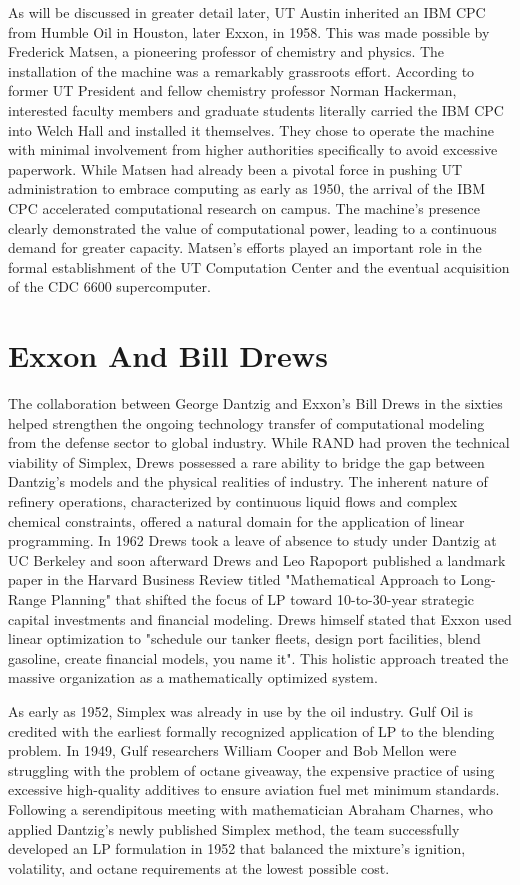 As will be discussed in greater detail later, UT Austin inherited an IBM CPC from Humble Oil in Houston, later Exxon, in 1958. This was made possible by Frederick Matsen, a pioneering professor of chemistry and physics. The installation of the machine was a remarkably grassroots effort. According to former UT President and fellow chemistry professor Norman Hackerman, interested faculty members and graduate students literally carried the IBM CPC into Welch Hall and installed it themselves. They chose to operate the machine with minimal involvement from higher authorities specifically to avoid excessive paperwork. While Matsen had already been a pivotal force in pushing UT administration to embrace computing as early as 1950, the arrival of the IBM CPC accelerated computational research on campus. The machine's presence clearly demonstrated the value of computational power, leading to a continuous demand for greater capacity. Matsen's efforts played an important role in the formal establishment of the UT Computation Center and the eventual acquisition of the CDC 6600 supercomputer.

\section{Exxon And Bill Drews}

The collaboration between George Dantzig and Exxon’s Bill Drews in the sixties helped strengthen the ongoing technology transfer of computational modeling from the defense sector to global industry. While RAND had proven the technical viability of Simplex, Drews possessed a rare ability to bridge the gap between Dantzig’s models and the physical realities of industry. The inherent nature of refinery operations, characterized by continuous liquid flows and complex chemical constraints, offered a natural domain for the application of linear programming. In 1962 Drews took a leave of absence to study under Dantzig at UC Berkeley and soon afterward Drews and Leo Rapoport published a landmark paper in the Harvard Business Review titled "Mathematical Approach to Long-Range Planning" that shifted the focus of LP toward 10-to-30-year strategic capital investments and financial modeling. Drews himself stated that Exxon used linear optimization to "schedule our tanker fleets, design port facilities, blend gasoline, create financial models, you name it". This holistic approach treated the massive organization as a mathematically optimized system.

As early as 1952, Simplex was already in use by the oil industry. Gulf Oil is credited with the earliest formally recognized application of LP to the blending problem. In 1949, Gulf researchers William Cooper and Bob Mellon were struggling with the problem of octane giveaway, the expensive practice of using excessive high-quality additives to ensure aviation fuel met minimum standards. Following a serendipitous meeting with mathematician Abraham Charnes, who applied Dantzig’s newly published Simplex method, the team successfully developed an LP formulation in 1952 that balanced the mixture's ignition, volatility, and octane requirements at the lowest possible cost.

